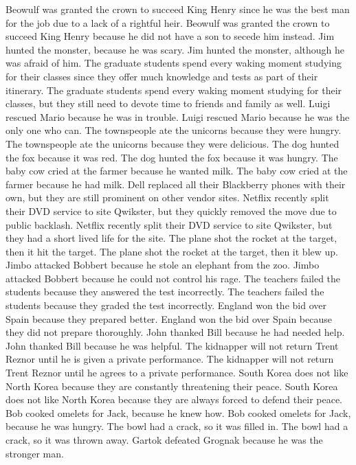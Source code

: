 \documentclass{article}
\begin{document}
\begin{enumerate}
	Beowulf was granted the crown to succeed King Henry since he was the best man for the job due to a lack of a rightful heir.
	Beowulf was granted the crown to succeed King Henry because he did not have a son to secede him instead.
	Jim hunted the monster, because he was scary.
	Jim hunted the monster, although he was afraid of him.
	The graduate students spend every waking moment studying for their classes since they offer much knowledge and tests as part of their itinerary.
	The graduate students spend every waking moment studying for their classes, but they still need to devote time to friends and family as well.
	Luigi rescued Mario because he was in trouble.
	Luigi rescued Mario because he was the only one who can.
	The townspeople ate the unicorns because they were hungry.
	The townspeople ate the unicorns because they were delicious.
	The dog hunted the fox because it was red.
	The dog hunted the fox because it was hungry.
	The baby cow cried at the farmer because he wanted milk.
	The baby cow cried at the farmer because he had milk.
	Dell replaced all their Blackberry phones with their own, but they are still prominent on other vendor sites.
	Netflix recently split their DVD service to site Qwikster, but they quickly removed the move due to public backlash.
	Netflix recently split their DVD service to site Qwikster, but they had a short lived life for the site.
	The plane shot the rocket at the target, then it hit the target.
	The plane shot the rocket at the target, then it blew up.
	Jimbo attacked Bobbert because he stole an elephant from the zoo.
	Jimbo attacked Bobbert because he could not control his rage.
	The teachers failed the students because they answered the test incorrectly.
	The teachers failed the students because they graded the test incorrectly.
	England won the bid over Spain because they prepared better.
	England won the bid over Spain because they did not prepare thoroughly.
	John thanked Bill because he had needed help.
	John thanked Bill because he was helpful.
	The kidnapper will not return Trent Reznor until he is given a private performance.
	The kidnapper will not return Trent Reznor until he agrees to a private performance.
	South Korea does not like North Korea because they are constantly threatening their peace.
	South Korea does not like North Korea because they are always forced to defend their peace.
	Bob cooked omelets for Jack, because he knew how.
	Bob cooked omelets for Jack, because he was hungry.
	The bowl had a crack, so it was filled in.
	The bowl had a crack, so it was thrown away.
	Gartok defeated Grognak because he was the stronger man.

\end{enumerate}
\end{document}
